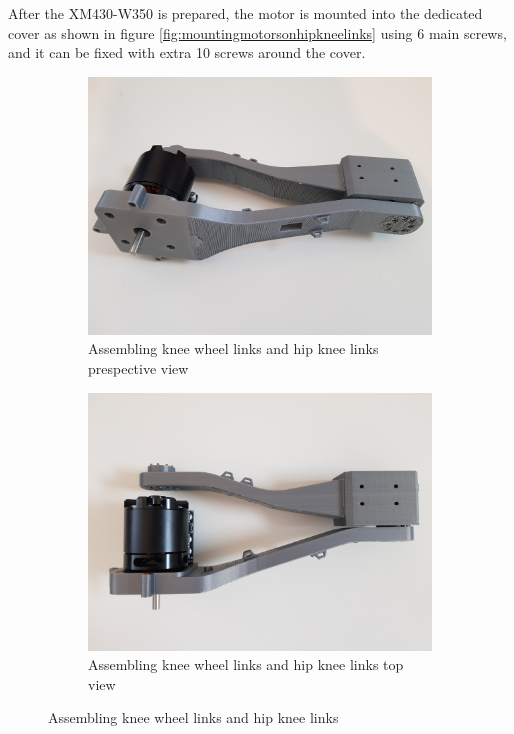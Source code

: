 After the XM430-W350 is prepared, the motor is mounted into the dedicated cover as shown in figure \ref{fig:mountingmotorsonhipkneelinks} using 6 main screws, and it can be fixed with extra 10 screws around the cover.
\begin{figure}[h]
	\centering
	\begin{subfigure}[t]{0.45\textwidth}
		\includegraphics[height=0.7\textwidth]{assembling_knee_wheel_links_and_hip_knee_links_1}
		\caption{Assembling knee wheel links and hip knee links	prespective view}
		\label{fig:assemblingkneewheellinksandhipkneelinksprespectiveview}
	\end{subfigure}
	\begin{subfigure}[t]{0.45\textwidth}
		\includegraphics[height=0.7\textwidth]{assembling_knee_wheel_links_and_hip_knee_links_2}
		\caption{Assembling knee wheel links and hip knee links	top view}
		\label{fig:assemblingkneewheellinksandhipkneelinkstopview}
	\end{subfigure}
	\caption{Assembling knee wheel links and hip knee links}
	\label{fig:Assembling knee wheel links and hip knee links}
\end{figure}

